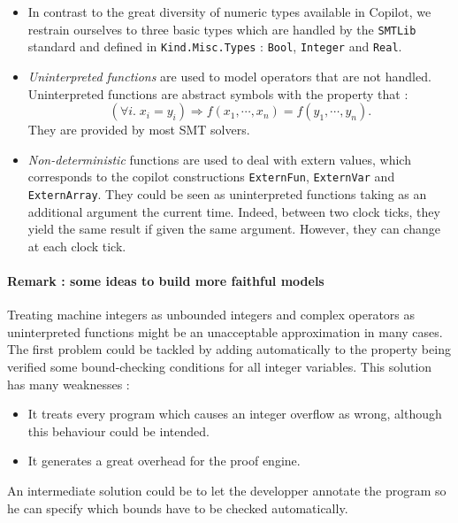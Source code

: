 \begin{itemize}
\item In contrast to the great diversity of numeric types available in Copilot, we restrain ourselves to three basic types which are handled by the \texttt{SMTLib} standard and defined in \texttt{Kind.Misc.Types} : \texttt{Bool}, \texttt{Integer} and \texttt{Real}.


\item \textit{Uninterpreted functions} are used to model operators that are not handled. Uninterpreted functions are abstract symbols with the property that : $$ \left( \forall i . \; x_i = y_i \right) \Longrightarrow f(x_1, \cdots, x_n) = f(y_1, \cdots, y_n). $$ They are provided by most SMT solvers.

\item \textit{Non-deterministic} functions are used to deal with extern values, which corresponds to the copilot constructions \texttt{ExternFun}, \texttt{ExternVar} and \texttt{ExternArray}. They could be seen as uninterpreted functions taking as an additional argument the current time. Indeed, between two clock ticks, they yield the same result if given the same argument. However, they can change at each clock tick.

\end{itemize}


\paragraph{Remark : some ideas to build more faithful models}

Treating machine integers as unbounded integers and complex operators as uninterpreted functions might be an unacceptable approximation in many cases. The first problem could be tackled by adding automatically to the property being verified some bound-checking conditions for all integer variables. This solution has many weaknesses :

\begin{itemize}
\item It treats every program which causes an integer overflow as wrong, although this behaviour could be intended.
\item It generates a great overhead for the proof engine.
\end{itemize}

An intermediate solution could be to let the developper annotate the program so he can specify which bounds have to be checked automatically.


